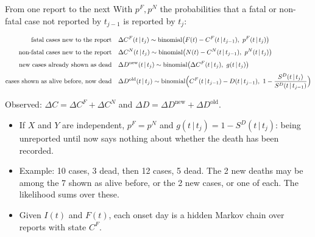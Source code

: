 \documentclass[aspectratio=169,9pt]{beamer}
\newcommand{\given}{\,|\,}
\newcommand{\bin}{\operatorname{binomial}}
\newcommand{\dnew}{\Delta D^{\mathrm{new}}}
\newcommand{\dold}{\Delta D^{\mathrm{old}}}
\begin{document}
\begin{frame}{From one report to the next}
With $p^{F},p^{N}$ the probabilities that a fatal or non-fatal case not
reported by $t_{j-1}$ is reported by $t_j$:

\smallskip
\begin{align*}
\text{fatal cases new to the report}\quad
 & \Delta C^{F}(t\given t_j)\sim\bin\bigl(F(t)-C^{F}(t\given t_{j-1}),\ p^{F}(t\given t_j)\bigr)\\[3pt]
\text{non-fatal cases new to the report}\quad
 & \Delta C^{N}(t\given t_j)\sim\bin\bigl(N(t)-C^{N}(t\given t_{j-1}),\ p^{N}(t\given t_j)\bigr)\\[3pt]
\text{new cases already shown as dead}\quad
 & \dnew(t\given t_j)\sim\bin\bigl(\Delta C^{F}(t\given t_j),\ g(t\given t_j)\bigr)\\[3pt]
\text{cases shown as alive before, now dead}\quad
 & \dold(t\given t_j)\sim\bin\Bigl(C^{F}(t\given t_{j-1})-D(t\given t_{j-1}),\
 1-\frac{S^{D}(t\given t_j)}{S^{D}(t\given t_{j-1})}\Bigr)
\end{align*}

\smallskip
Observed: $\Delta C=\Delta C^{F}+\Delta C^{N}$ and $\Delta D=\dnew+\dold$.

\medskip
\small
\begin{itemize}
\item If $X$ and $Y$ are independent, $p^{F}=p^{N}$ and
$g(t\given t_j)=1-S^{D}(t\given t_j)$: being unreported until now says
nothing about whether the death has been recorded.
\item Example: 10 cases, 3 dead, then 12 cases, 5 dead. The 2 new deaths may
be among the 7 shown as alive before, or the 2 new cases, or one of each.
The likelihood sums over these.
\item Given $I(t)$ and $F(t)$, each onset day is a hidden Markov chain over
reports with state $C^{F}$.
\end{itemize}
\end{frame}
\end{document}
